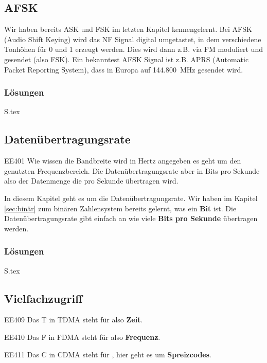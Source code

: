 \documentclass[10pt,a4paper,ngerman]{article}
\theoremstyle{definition}
\theoremstyle{plain}
\theoremstyle{mytheorem}
\theoremstyle{definition}
\newenvironment{ohmchapter}{}
{
  \subsubsection*{Lösungen}
  S\arabic{subsection}.tex}
}
\begin{document}
\subsection{AFSK}
\begin{ohmchapter}
Wir haben bereits ASK und FSK im letzten Kapitel kennengelernt.
Bei AFSK (Audio Shift Keying) wird das NF Signal digital umgetastet, in dem verschiedene Tonhöhen für 0 und 1 erzeugt werden. Dies wird dann z.B. via FM moduliert und gesendet (also FSK).
Ein bekanntest AFSK Signal ist z.B. APRS (Automatic Packet Reporting System), dass in Europa auf \SI{144,800}{\mega\hertz} gesendet wird.

\end{ohmchapter}

\subsection{Datenübertragungsrate}

\begin{sol}{EE401}
Wie wissen die Bandbreite wird in Hertz angegeben es geht um den genutzten Frequenzbereich. Die Datenübertragungsrate aber in Bits pro Sekunde also der Datenmenge die pro Sekunde übertragen wird.

\end{sol}

\begin{ohmchapter}
  In diesem Kapitel geht es um die Datenübertragungsrate. Wir haben im Kapitel \ref{sec:binär} zum binären Zahlensystem bereits gelernt, was ein \textbf{Bit} ist. 
  Die Datenübertragungsrate gibt einfach an wie viele \textbf{Bits pro Sekunde} übertragen werden.
\end{ohmchapter}  


\subsection{Vielfachzugriff}

\begin{sol}{EE409}
Das T in TDMA steht für  also \textbf{Zeit}.
\end{sol}

\begin{sol}{EE410}
Das F in FDMA steht für  also \textbf{Frequenz}.
\end{sol}

\begin{sol}{EE411}
Das C in CDMA steht für , hier geht es um  \textbf{Spreizcodes}.
\end{sol}
\end{document}
